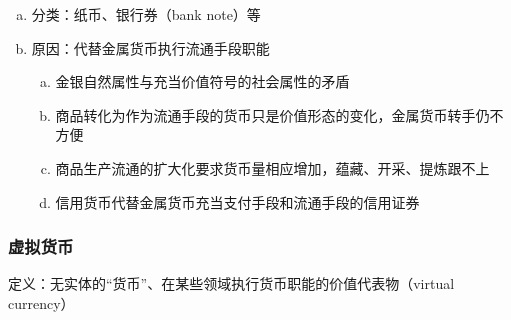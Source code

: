 \documentclass[12pt]{book}
\begin{document}
\begin{enumerate}[1.]
\begin{enumerate}[(1)]
\begin{enumerate}[a.]
                        \item 分类：纸币、银行券（bank note）等
                        \item 原因：代替金属货币执行流通手段职能
                              \begin{enumerate}[(a)]
                                  \item 金银自然属性与充当价值符号的社会属性的矛盾
                                  \item 商品转化为作为流通手段的货币只是价值形态的变化，金属货币转手仍不方便
                                  \item 商品生产流通的扩大化要求货币量相应增加，蕴藏、开采、提炼跟不上
                                  \item 信用货币代替金属货币充当支付手段和流通手段的信用证券
                              \end{enumerate}
                    \end{enumerate}
          \end{enumerate}
\end{enumerate}



\subsubsection{虚拟货币}

定义：无实体的“货币”、在某些领域执行货币职能的价值代表物（virtual currency）

\end{document}
